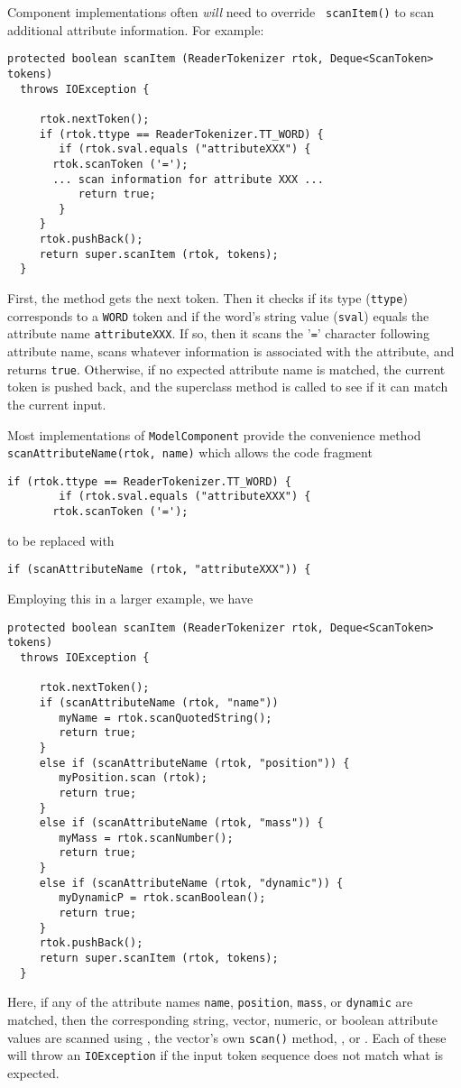 \documentclass{article}
\begin{document}
Component implementations often {\it will} need to override {\tt
scanItem()} to scan additional attribute information. For example:
\begin{lstlisting}[]
  protected boolean scanItem (ReaderTokenizer rtok, Deque<ScanToken> tokens)
  throws IOException {

     rtok.nextToken();
     if (rtok.ttype == ReaderTokenizer.TT_WORD) {
        if (rtok.sval.equals ("attributeXXX") {
	   rtok.scanToken ('=');
	   ... scan information for attribute XXX ...
           return true;
        }
     }
     rtok.pushBack();
     return super.scanItem (rtok, tokens);
  }	
\end{lstlisting}
First, the method gets the next token. Then it checks if its type
({\tt ttype}) corresponds to a {\tt WORD} token and if the word's string
value ({\tt sval}) equals the attribute name {\tt attributeXXX}.  If
so, then it scans the '{\tt =}' character following attribute name,
scans whatever information is associated with the attribute, and
returns {\tt true}.  Otherwise, if no expected attribute name is
matched, the current token is pushed back, and the superclass method
is called to see if it can match the current input.

Most implementations of {\tt ModelComponent}
provide the convenience method {\tt scanAttributeName(rtok, name)}
which allows the code fragment 
\begin{lstlisting}[]
     if (rtok.ttype == ReaderTokenizer.TT_WORD) {        
        if (rtok.sval.equals ("attributeXXX") {
	   rtok.scanToken ('=');
\end{lstlisting}
to be replaced with
\begin{lstlisting}[]
      if (scanAttributeName (rtok, "attributeXXX")) {
\end{lstlisting}
Employing this in a larger example, we have
\begin{lstlisting}[]
  protected boolean scanItem (ReaderTokenizer rtok, Deque<ScanToken> tokens)
  throws IOException {

     rtok.nextToken();
     if (scanAttributeName (rtok, "name")) 
        myName = rtok.scanQuotedString();
        return true;
     }
     else if (scanAttributeName (rtok, "position")) {
        myPosition.scan (rtok);
        return true;
     }
     else if (scanAttributeName (rtok, "mass")) {
        myMass = rtok.scanNumber();
        return true;
     }
     else if (scanAttributeName (rtok, "dynamic")) {
        myDynamicP = rtok.scanBoolean();
        return true;
     }
     rtok.pushBack();
     return super.scanItem (rtok, tokens);
  }	
\end{lstlisting}
Here, if any of the attribute names 
{\tt name}, {\tt position}, {\tt mass}, or {\tt dynamic} are matched,
then the 
corresponding string, vector, numeric, or boolean attribute values are
scanned using
, the
vector's own {\tt scan()} method,
, or
.  Each of
these will throw an {\tt IOException} if the input token sequence does
not match what is expected.
\end{document}
